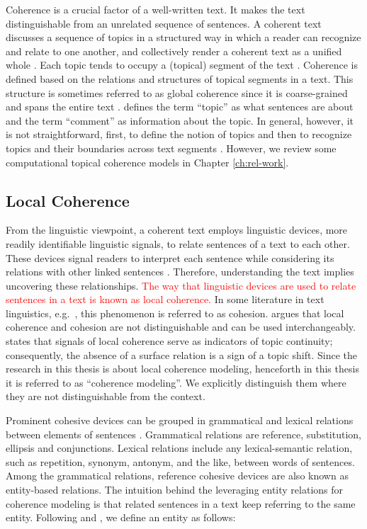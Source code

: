 Coherence is a crucial factor of a well-written text. 
It makes the text distinguishable from an unrelated sequence of sentences. 
A coherent text discusses a sequence of topics in a structured way in which a reader can recognize and relate to one another, and collectively render a coherent text as a unified whole \cite{stede12}. 
Each topic tends to occupy a (topical) segment of the text \cite{hearst97}. 
Coherence is defined based on the relations and structures of topical segments in a text. 
This structure is sometimes referred to as global coherence since it is coarse-grained and spans the entire text \cite{elsner07}. 
 defines the term ``topic'' as what sentences are about and the term ``comment'' as information about the topic.  
In general, however, it is not straightforward, first, to define the notion of topics and then to recognize topics and their boundaries across text segments \cite{stede12}.
However, we review some computational topical coherence models in Chapter \ref{ch:rel-work}. 


\subsection{Local Coherence}

From the linguistic viewpoint, a coherent text employs linguistic devices, more readily identifiable linguistic signals, to relate sentences of a text to each other. 
These devices signal readers to interpret each sentence while considering its relations with other linked sentences \cite{vandijk77}. 
Therefore, understanding the text implies uncovering these relationships.  
\textcolor{red}{The way that linguistic devices are used to relate sentences in a text is known as local coherence.} 
In some literature in text linguistics, e.g.\ , this phenomenon is referred to as cohesion.   
 argues that local coherence and cohesion are not distinguishable and can be used interchangeably. 
 states that signals of local coherence serve as indicators of topic continuity; consequently, the absence of a surface relation is a sign of a topic shift. 
Since the research in this thesis is about local coherence modeling, henceforth in this thesis it is referred to as ``coherence modeling''. 
We explicitly distinguish them where they are not distinguishable from the context. 

Prominent cohesive devices can be grouped in grammatical and lexical relations between elements of sentences \cite{halliday76}. 
Grammatical relations are reference, substitution, ellipsis and conjunctions. 
Lexical relations include any lexical-semantic relation, such as repetition, synonym, antonym, and the like, between words of sentences. 
Among the grammatical relations, reference cohesive devices are also known as entity-based relations. 
The intuition behind the leveraging entity relations for coherence modeling is that related sentences in a text keep referring to the same entity. 
Following  and , we define an entity as follows: 

